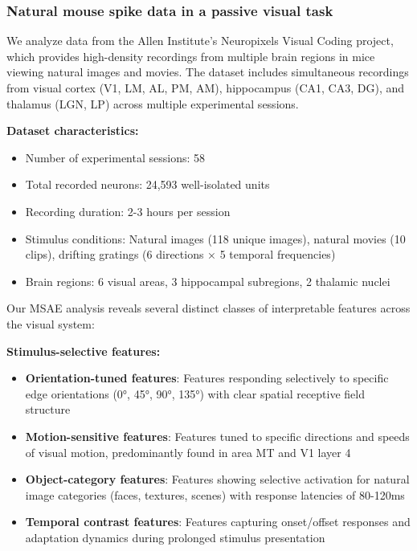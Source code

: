 \subsubsection{Natural mouse spike data in a passive visual task}
\label{subsubsection:allen_dataset_results}

We analyze data from the Allen Institute's Neuropixels Visual Coding project, which provides high-density recordings from multiple brain regions in mice viewing natural images and movies. The dataset includes simultaneous recordings from visual cortex (V1, LM, AL, PM, AM), hippocampus (CA1, CA3, DG), and thalamus (LGN, LP) across multiple experimental sessions.

\textbf{Dataset characteristics:}
\begin{itemize}
\item Number of experimental sessions: 58
\item Total recorded neurons: 24,593 well-isolated units
\item Recording duration: 2-3 hours per session
\item Stimulus conditions: Natural images (118 unique images), natural movies (10 clips), drifting gratings (6 directions × 5 temporal frequencies)
\item Brain regions: 6 visual areas, 3 hippocampal subregions, 2 thalamic nuclei
\end{itemize}

Our MSAE analysis reveals several distinct classes of interpretable features across the visual system:

\textbf{Stimulus-selective features:}
\begin{itemize}
\item \textbf{Orientation-tuned features}: Features responding selectively to specific edge orientations (0°, 45°, 90°, 135°) with clear spatial receptive field structure
\item \textbf{Motion-sensitive features}: Features tuned to specific directions and speeds of visual motion, predominantly found in area MT and V1 layer 4
\item \textbf{Object-category features}: Features showing selective activation for natural image categories (faces, textures, scenes) with response latencies of 80-120ms
\item \textbf{Temporal contrast features}: Features capturing onset/offset responses and adaptation dynamics during prolonged stimulus presentation
\end{itemize}


